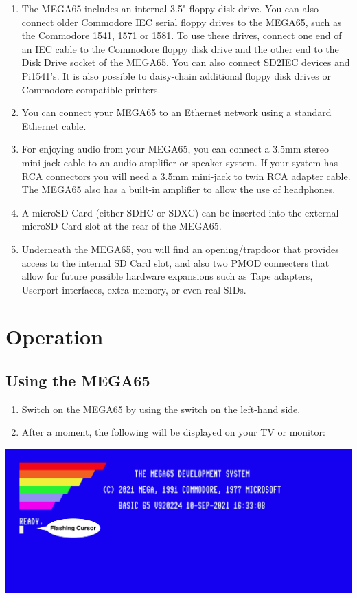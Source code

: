 \begin{enumerate}
	\item The MEGA65 includes an internal 3.5" floppy disk drive. You can also connect older Commodore{\textregistered} IEC serial floppy drives to the MEGA65, such as the Commodore{\textregistered} 1541, 1571 or 1581. To use these drives, connect one end of an IEC cable to the Commodore{\textregistered} floppy disk drive and the other end to the Disk Drive socket of the MEGA65. You can also connect SD2IEC devices and Pi1541's. It is also possible to daisy-chain additional floppy disk drives or Commodore{\textregistered} compatible printers.
	\item You can connect your MEGA65 to an Ethernet network using a standard Ethernet cable.
	\item For enjoying audio from your MEGA65, you can connect a 3.5mm stereo mini-jack cable to an audio amplifier or speaker system. If your system has RCA connectors you will need a 3.5mm mini-jack to twin RCA adapter cable. The MEGA65 also has a built-in amplifier to allow the use of headphones.
	\item A microSD Card (either SDHC or SDXC) can be inserted into the external microSD Card slot at the rear of the MEGA65.
    \item Underneath the MEGA65, you will find an opening/trapdoor that provides access to the internal SD Card slot, and also two PMOD connecters that allow for future possible hardware expansions such as Tape adapters, Userport interfaces, extra memory, or even real SIDs.
\end{enumerate}


\section{Operation}

\subsection{Using the MEGA65}

\begin{enumerate}
	\item Switch on the MEGA65 by using the switch on the left-hand side.
	\item After a moment, the following will be displayed on your TV or monitor:
\end{enumerate}

\includegraphics[width=\linewidth]{images/introduction-screen/switched-on.png}

